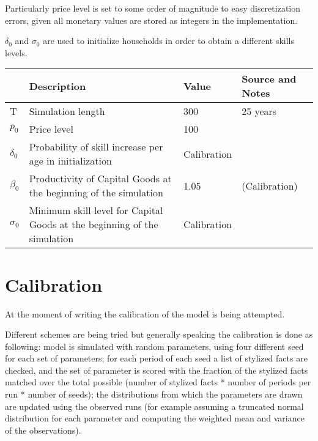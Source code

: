 \documentclass[a4paper, headings=standardclasses]{scrartcl}
\numberwithin{equation}{subsection}
\begin{document}
Particularly price level is set to some order of magnitude to easy discretization errors, given all monetary values are stored as integers in the implementation.

$\delta_0$ and $\sigma_0$ are used to initialize households in order to obtain a different skills levels.

\begin{xltabular}{\linewidth}{lXlX}
    \toprule
    & Description                                                  & Value & Source and Notes                                                                                                                                            \\
    \toprule \endhead
    \bottomrule \endfoot
    T & Simulation length & 300 & 25 years \\
    $p_0$ & Price level & 100 & \\
    $\delta_0$ & Probability of skill increase per age in initialization & Calibration & \\
    $\beta_0$ & Productivity of Capital Goods at the beginning of the simulation & 1.05 & (Calibration) \\
    $\sigma_0$ & Minimum skill level for Capital Goods at the beginning of the simulation & Calibration & \\
\end{xltabular}

\section{Calibration}
At the moment of writing the calibration of the model is being attempted.

Different schemes are being tried but generally speaking the calibration is done as following: model is simulated with random parameters, using four different seed for each set of parameters; for each period of each seed a list of stylized facts are checked, and the set of parameter is scored with the fraction of the stylized facts matched over the total possible (number of stylized facts * number of periods per run * number of seeds); the distributions from which the parameters are drawn are updated using the observed runs (for example assuming a truncated normal distribution for each parameter and computing the weighted mean and variance of the observations).
\end{document}
